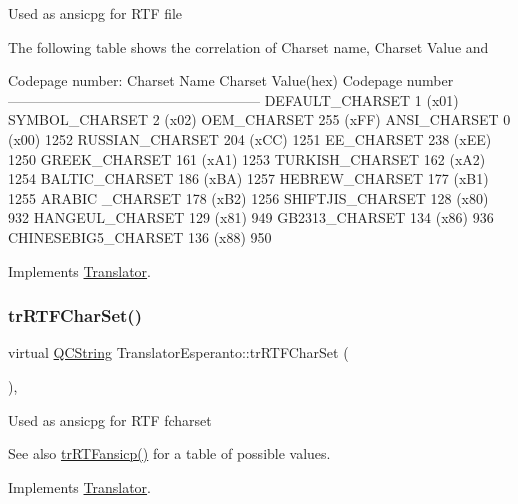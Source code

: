 Used as ansicpg for R\+TF file

The following table shows the correlation of Charset name, Charset Value and 
\begin{DoxyPre}
Codepage number:
Charset Name       Charset Value(hex)  Codepage number
------------------------------------------------------
DEFAULT\_CHARSET           1 (x01)
SYMBOL\_CHARSET            2 (x02)
OEM\_CHARSET             255 (xFF)
ANSI\_CHARSET              0 (x00)            1252
RUSSIAN\_CHARSET         204 (xCC)            1251
EE\_CHARSET              238 (xEE)            1250
GREEK\_CHARSET           161 (xA1)            1253
TURKISH\_CHARSET         162 (xA2)            1254
BALTIC\_CHARSET          186 (xBA)            1257
HEBREW\_CHARSET          177 (xB1)            1255
ARABIC \_CHARSET         178 (xB2)            1256
SHIFTJIS\_CHARSET        128 (x80)             932
HANGEUL\_CHARSET         129 (x81)             949
GB2313\_CHARSET          134 (x86)             936
CHINESEBIG5\_CHARSET     136 (x88)             950
\end{DoxyPre}
 

Implements \mbox{\hyperlink{class_translator_a9953a4c0e6a4fc7d017abcd5c2939e0f}{Translator}}.

\mbox{\label{class_translator_esperanto_a2ed462105731513920d8dbc72e91b244}} 
\subsubsection{\texorpdfstring{trRTFCharSet()}{trRTFCharSet()}}
{\footnotesize\ttfamily virtual \mbox{\hyperlink{class_q_c_string}{Q\+C\+String}} Translator\+Esperanto\+::tr\+R\+T\+F\+Char\+Set (\begin{DoxyParamCaption}{ }\end{DoxyParamCaption})\hspace{0.3cm}{\ttfamily [inline]}, {\ttfamily [virtual]}}

Used as ansicpg for R\+TF fcharset \begin{DoxySeeAlso}{See also}
\mbox{\hyperlink{class_translator_esperanto_a67812d3ba72d5596dfe4bfb645ac18c7}{tr\+R\+T\+Fansicp()}} for a table of possible values. 
\end{DoxySeeAlso}


Implements \mbox{\hyperlink{class_translator_afad391f3cbfb5ce6332b7239f8e2049a}{Translator}}.

